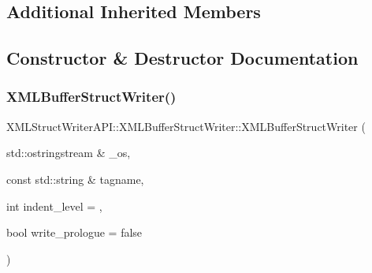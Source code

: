 \subsection*{Additional Inherited Members}


\subsection{Constructor \& Destructor Documentation}
\mbox{\label{classXMLStructWriterAPI_1_1XMLBufferStructWriter_adc348003ff0e12b5a820972cbc51a376}} 
\subsubsection{\texorpdfstring{XMLBufferStructWriter()}{XMLBufferStructWriter()}\hspace{0.1cm}{\footnotesize\ttfamily [1/3]}}
{\footnotesize\ttfamily X\+M\+L\+Struct\+Writer\+A\+P\+I\+::\+X\+M\+L\+Buffer\+Struct\+Writer\+::\+X\+M\+L\+Buffer\+Struct\+Writer (\begin{DoxyParamCaption}\item[{std\+::ostringstream \&}]{\+\_\+os,  }\item[{const std\+::string \&}]{tagname,  }\item[{int}]{indent\+\_\+level = {},  }\item[{bool}]{write\+\_\+prologue = {\ttfamily false} }\end{DoxyParamCaption})\hspace{0.3cm}{\ttfamily [inline]}}

